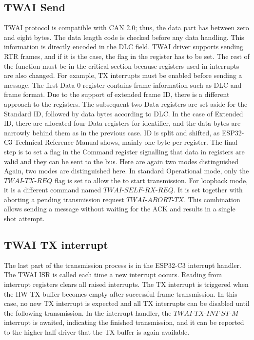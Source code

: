 \documentclass{ctuthesis}
\begin{document}
 \subsection{TWAI Send}
 TWAI protocol is compatible with CAN 2.0; thus, the data part has between zero and eight bytes. The data length code is checked before any data handling. This information is directly encoded in the DLC field. TWAI driver supports sending RTR frames, and if it is the case, the flag in the register has to be set. The rest of the function must be in the critical section because registers used in interrupts are also changed. For example, TX interrupts must be enabled before sending a message. The first Data 0 register contains frame information such as DLC and frame format. Due to the support of extended frame ID, there is a different approach to the registers. The subsequent two Data registers are set aside for the Standard ID, followed by data bytes according to DLC. In the case of Extended ID, there are allocated four Data registers for identifier, and the data bytes are narrowly behind them as in the previous case. ID is split and shifted, as ESP32-C3 Technical Reference Manual shows, mainly one byte per register.
 The final step is to set a flag in the Command register signalling that data in registers are valid and they can be sent to the bus. Here are again two modes distinguished Again, two modes are distinguished here. In standard Operational mode, only the $TWAI\text{-}TX\text{-}REQ$ flag is set to allow the to start transmission. For loopback mode, it is a different command named $TWAI\text{-}SELF\text{-}RX\text{-}REQ$. It is set together with aborting a pending transmission request $TWAI\text{-}ABORT\text{-}TX$. This combination allows sending a message without waiting for the ACK and results in a single shot attempt.
 
 \subsection{TWAI TX interrupt}
 The last part of the transmission process is in the ESP32-C3 interrupt handler. The TWAI ISR is called each time a new interrupt occurs. Reading from interrupt registers clears all raised interrupts. The TX interrupt is triggered when the HW TX buffer becomes empty after successful frame transmission. In this case, no new TX interrupt is expected and all TX interrupts can be disabled until the following transmission. In the interrupt handler, the  $TWAI\text{-}TX\text{-}INT\text{-}ST\text{-}M$ interrupt is awaited, indicating the finished transmission, and it can be reported to the higher half driver that the TX buffer is again available.
 
\end{document}

